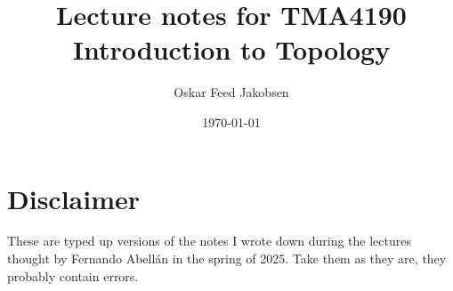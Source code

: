\documentclass{article}
\title{Lecture notes for TMA4190 Introduction to Topology}
\date{\today}
\author{Oskar Feed Jakobsen}
\begin{document}
\maketitle
\newpage
\tableofcontents
\newpage
\section*{Disclaimer}

These are typed up versions of the notes I wrote down during the
lectures thought by Fernando Abellán
in the spring of 2025.
Take them as they are, they probably contain errors.

\newpage

























\end{document}
